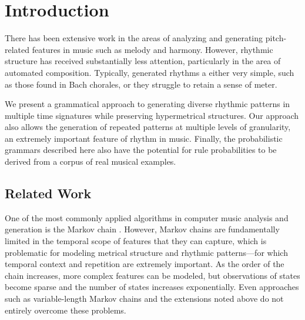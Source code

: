 \documentclass{article}
\title{\papertitle}
\begin{document}
%
\capstartfalse
\maketitle
\capstarttrue
%
\begin{abstract}
We present an approach for generating passages of rhythm via the use of a probabilistic temporal graph grammar with rule sets that operate via recursive subdivision. This project is motivated by three factors: (1) the recognition that the literature on computer-generated rhythm is generally not as robust as those for melody and harmony; (2) the creation of more tools for computer-assisted composition; and (3) the hope that such an approach, having already produced compelling results for some styles of music, may provide insight into the structure of rhythms found in existing repertoires.
\end{abstract}


\section{Introduction}\label{sec:introduction}

There has been extensive work in the areas of analyzing and generating pitch-related features in music such as melody and harmony. However, rhythmic structure has received substantially less attention, particularly in the area of automated composition. Typically, generated rhythms a either very simple, such as those found in Bach chorales, or they struggle to retain a sense of meter. 

We present a grammatical approach to generating diverse rhythmic patterns in multiple time signatures while preserving hypermetrical structures. Our approach also allows the generation of repeated patterns at multiple levels of granularity, an extremely important feature of rhythm in music. Finally, the probabilistic grammars described here also have the potential for rule probabilities to be derived from a corpus of real musical examples.

\subsection{Related Work}

One of the most commonly applied algorithms in computer music analysis and generation is the Markov chain \cite{chordia2011, gillick2009, yi, pachet}. However, Markov chains are fundamentally limited in the temporal scope of features that they can capture, which is problematic for modeling metrical structure and rhythmic patterns---for which temporal context and repetition are extremely important. As the order of the chain increases, more complex features can be modeled, but observations of states become sparse and the number of states increases exponentially. Even approaches such as variable-length Markov chains \cite{ron, buhlmann} and the extensions noted above do not entirely overcome these problems.
\end{document}
